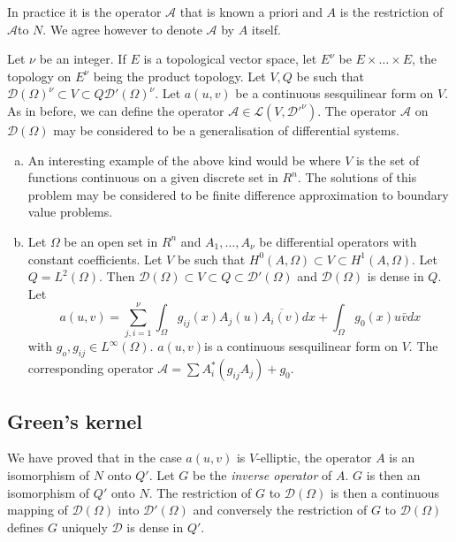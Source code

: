\begin{remark*}%
  In practice it is the operator $\mathscr{A} $ that is known a priori
  and $A$ is the restriction of  $\mathscr{A} $to $N$. We agree however
  to denote $\mathscr{A} $ by $A$ itself. 
\end{remark*}


Let $\nu$ be an integer. If $E$ is a topological vector space, let
$E^\nu $ be $E \times \ldots \times E$, the topology on $E^\nu$ being the
product topology. Let $V, Q$ be such that $\mathscr{D}(\Omega)^\nu
\subset V \subset Q \mathscr{D}'(\Omega)^\nu$. Let $a(u, v)$ be a
continuous sesquilinear form on $V$. As in before, we can define the
operator $\mathscr{A} \in \mathscr{L}(V,
\mathscr{D}'^\nu)$. The operator $\mathscr{A} $ on
$\mathscr{D}(\Omega)$ may be considered to be a generalisation of
differential systems. 

\begin{enumerate}[a)]
\item An interesting example of the above kind would be where $V$ is
  the set of functions continuous on a given discrete set in
  $R^n$. The solutions of this problem may be considered to be finite
  difference approximation to boundary value problems. 
\item Let $\Omega$ be an open set in $R^n$ and $A_1, \ldots , A_\nu$
  be differential operators with constant coefficients. Let $V$ be such
  that $H^0 (A, \Omega) \subset V \subset H^1 (A, \Omega)$. Let $Q =
  L^2(\Omega)$. Then $\mathscr{D}(\Omega)\subset V \subset Q \subset
  \mathscr{D}'(\Omega)$ and $\mathscr{D}(\Omega)$ is dense in $Q$. Let 
$$
a(u, v) = \sum^{\nu}_{j, i=1} \int_{\Omega} g_{ij}(x)A_j
(u)\overline{A_i(v)} dx + \int_{\Omega} g_0 (x) u \bar{v} dx 
$$
with $ g_o, g_{ij} \in L^{\infty}(\Omega)$. 
$a(u,v)$\pageoriginale is a continuous sesquilinear form on $V$. The corresponding
operator $\mathscr{A} = \sum A^*_i (g_{ij}A_j) + g_0 $. 
\end{enumerate}

\subsection{Green's kernel}\label{lec7:sec3:subsec5}

We have proved that in the case $a(u, v)$ is $V$-elliptic, the operator
$A$ is an isomorphism of $N$ onto $Q'$. Let $G$ be the \textit{inverse
  operator} of $A$. $G$ is then an isomorphism of $Q'$ onto $N$. The
restriction of $G$ to $\mathscr{D}(\Omega)$ is then a continuous
mapping of  $\mathscr{D}(\Omega)$ into $\mathscr{D}'(\Omega)$ and
conversely the restriction of $G$ to $\mathscr{D}(\Omega)$ defines $G$
uniquely $\mathscr{D}$ is dense in $Q'$. 

